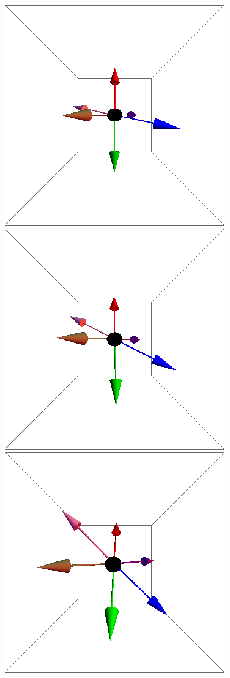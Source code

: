 \documentclass{article}
\begin{document}
\begin{figure}[ht]
\centering
\includegraphics[scale=0.28]{100/1S000to005G.png}
\includegraphics[scale=0.28]{100/39S000to005G.png}
\includegraphics[scale=0.28]{100/42S000to005G.png}

\end{figure}
\end{document}
